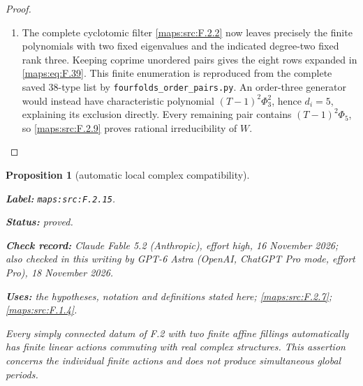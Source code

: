 \documentclass[11pt,a4paper]{article}
\newtheorem{proposition}[proposition]{Proposition}
\theoremstyle{definition}
\newcommand{\StatementRecord}[4]{\par\smallskip\begingroup\upshape\raggedright\noindent\textbf{Label:} \nolinkurl{#1}.\par\noindent\textbf{Status:} #2.\par\noindent\textbf{Check record:} #3.\par\noindent\textbf{Uses:} #4.\par\endgroup\smallskip}
\newcommand{\CurrentChecker}{GPT-6 Astra (OpenAI, ChatGPT Pro mode, effort Pro), 18 November 2026}
\begin{document}
\begin{proof}
\begin{enumerate}[label=\arabic*.]
\item The complete cyclotomic filter \ref{maps:src:F.2.2} now leaves precisely
the finite polynomials with two fixed eigenvalues and
the indicated degree-two fixed rank three.
Keeping coprime unordered pairs gives the eight rows
expanded in \eqref{maps:eq:F.39}.  This finite enumeration is reproduced
from the complete saved 38-type list by
\texttt{fourfolds\_order\_pairs.py}.
An order-three generator would instead have characteristic
polynomial $(T-1)^2\Phi_3^2$, hence $d_i=5$, explaining
its exclusion directly.
Every remaining pair contains $(T-1)^2\Phi_5$, so \ref{maps:src:F.2.9}
proves rational irreducibility of $W$.

\end{enumerate}
\end{proof}




\begin{proposition}[automatic local complex compatibility]\label{maps:src:F.2.15}
\StatementRecord{maps:src:F.2.15}{proved}{Claude Fable 5.2 (Anthropic), effort high, 16 November 2026; also checked in this writing by \CurrentChecker}{the hypotheses, notation and definitions stated here; \cref{maps:src:F.2.7}; \cref{maps:src:F.1.4}}


Every simply connected datum of F.2 with two finite affine
fillings automatically has finite linear actions commuting
with real complex structures.  This assertion concerns the
individual finite actions and does not produce simultaneous
global periods.

\end{proposition}
\end{document}
